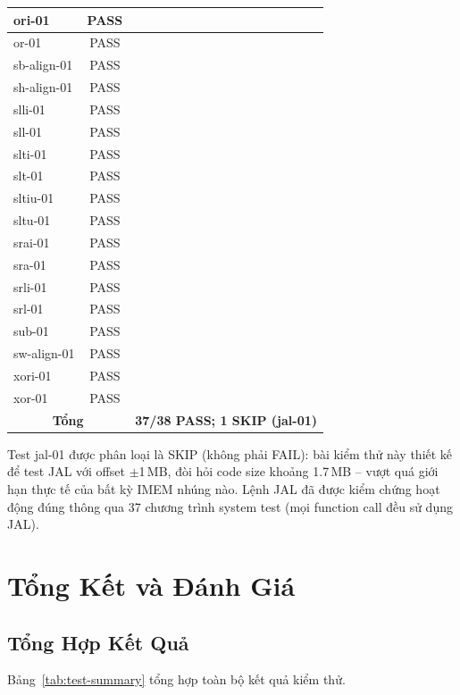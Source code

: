 \begin{table}[htbp]
\begin{center}
\begin{tabular}{|l|c|l|}
ori-01 & PASS & \\ \hline
or-01 & PASS & \\ \hline
sb-align-01 & PASS & \\ \hline
sh-align-01 & PASS & \\ \hline
slli-01 & PASS & \\ \hline
sll-01 & PASS & \\ \hline
slti-01 & PASS & \\ \hline
slt-01 & PASS & \\ \hline
sltiu-01 & PASS & \\ \hline
sltu-01 & PASS & \\ \hline
srai-01 & PASS & \\ \hline
sra-01 & PASS & \\ \hline
srli-01 & PASS & \\ \hline
srl-01 & PASS & \\ \hline
sub-01 & PASS & \\ \hline
sw-align-01 & PASS & \\ \hline
xori-01 & PASS & \\ \hline
xor-01 & PASS & \\ \hline
\hline
\multicolumn{2}{|c|}{\textbf{Tổng}} & \textbf{37/38 PASS; 1 SKIP (jal-01)} \\ \hline
\end{tabular}
\end{center}
\end{table}

Test jal-01 được phân loại là SKIP (không phải FAIL): bài kiểm thử này thiết kế để test JAL với offset $\pm$1\,MB, đòi hỏi code size khoảng 1.7\,MB -- vượt quá giới hạn thực tế của bất kỳ IMEM nhúng nào. Lệnh JAL đã được kiểm chứng hoạt động đúng thông qua 37 chương trình system test (mọi function call đều sử dụng JAL).

\section{Tổng Kết và Đánh Giá}

\subsection{Tổng Hợp Kết Quả}

Bảng~\ref{tab:test-summary} tổng hợp toàn bộ kết quả kiểm thử.

